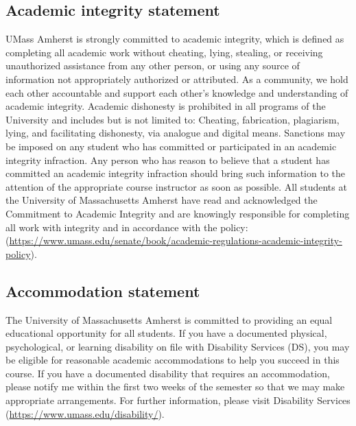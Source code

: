\documentclass[11pt]{article}
\begin{document}
\subsection*{Academic integrity statement}
\label{sec:org72ebc6e}
UMass Amherst is strongly committed to academic integrity, which is defined as
completing all academic work without cheating, lying, stealing, or receiving
unauthorized assistance from any other person, or using any source of
information not appropriately authorized or attributed. As a community, we hold
each other accountable and support each other’s knowledge and understanding of
academic integrity. Academic dishonesty is prohibited in all programs of the
University and includes but is not limited to: Cheating, fabrication,
plagiarism, lying, and facilitating dishonesty, via analogue and digital means.
Sanctions may be imposed on any student who has committed or participated in an
academic integrity infraction. Any person who has reason to believe that a
student has committed an academic integrity infraction should bring such
information to the attention of the appropriate course instructor as soon as
possible. All students at the University of Massachusetts Amherst have read and
acknowledged the Commitment to Academic Integrity and are knowingly responsible
for completing all work with integrity and in accordance with the policy:
(\url{https://www.umass.edu/senate/book/academic-regulations-academic-integrity-policy}).

\subsection*{Accommodation statement}
\label{sec:orgfea4b90}
The University of Massachusetts Amherst is committed to providing an equal
educational opportunity for all students. If you have a documented physical,
psychological, or learning disability on file with Disability Services (DS),
you may be eligible for reasonable academic accommodations to help you succeed
in this course. If you have a documented disability that requires an
accommodation, please notify me within the first two weeks of the semester so
that we may make appropriate arrangements. For further information, please
visit Disability Services (\url{https://www.umass.edu/disability/}).
\end{document}
